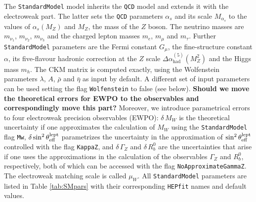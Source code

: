 \documentclass[preprint,3p,12pt]{elsarticle}
\newcommand{\HEPfit}{\texttt{HEPfit}\xspace}
\begin{document}
The \texttt{StandardModel} model inherits the \texttt{QCD} model and extends it with the electroweak part. The latter sets the \texttt{QCD} parameters $\alpha_s$ and its scale $M_{\alpha_s}$ to the values of $\alpha_s(M_Z)$ and $M_Z$, the mass of the $Z$ boson. The neutrino masses are $m_{\nu_1}$, $m_{\nu_2}$, $m_{\nu_3}$ and the charged lepton masses $m_e$, $m_\mu$ and $m_\tau$.
Further \texttt{StandardModel} parameters are the Fermi constant $G_\mu$, the fine-structure constant $\alpha$, its five-flavour hadronic correction at the $Z$ scale $\Delta\alpha_{\mathrm{had}}^{(5)}(M_Z^2)$ and the Higgs mass $m_h$.
The CKM matrix is computed exactly, using the Wolfenstein parameters $\lambda$, $A$, $\bar{\rho}$ and $\bar{\eta}$ as input by default. A different set of input parameters can be used setting the flag \texttt{Wolfenstein} to false (see below).
\textbf{Should we move the theoretical errors for EWPO to the observables and correspondingly move this part?}
Moreover, we introduce parametrical errors to four electroweak precision observables (EWPO): $\delta\,M_W$ is the theoretical uncertainty if one approximates the calculation of $M_W$ using the \texttt{StandardModel} flag \texttt{Mw}, $\delta\sin^2\theta_{\rm eff}^{\rm lept}$ parametrizes the uncertainty in the approximation of $\sin^2\theta_{\rm eff}^{\rm lept}$ controlled with the flag \texttt{KappaZ}, and $\delta\,\Gamma_Z$ and $\delta\,R_b^0$ are the uncertainties that arise if one uses the approximations in the calculation of the observables $\Gamma_Z$ and $R_b^0$, respectively, both of which can be accessed with the flag \texttt{NoApproximateGammaZ}.
The electroweak matching scale is called $\mu_W$.
All \texttt{StandardModel} parameters are listed in Table \ref{tab:SMpars} with their corresponding \HEPfit names and default values.
\end{document}
